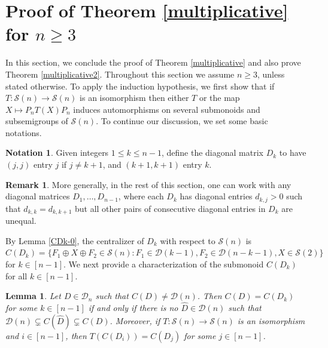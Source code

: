 \documentclass[11pt,reqno]{amsart}
\theoremstyle{plain}
\newtheorem{lemma}[theorem]{Lemma}
\theoremstyle{definition}
\newtheorem{defn}[theorem]{Definition}
\newtheorem{notation}[theorem]{Notation}
\newtheorem{rem}[theorem]{Remark}
\numberwithin{equation}{section}
\DeclareMathOperator{\diag}{diag}
\def\cS{\mathcal S}
\def\cD{\mathcal D}
\begin{document}
\section{Proof of Theorem \ref{multiplicative} for $n\geq3$}
In this section, we conclude the proof of Theorem \ref{multiplicative}  and also prove Theorem \ref{multiplicative2}.  Throughout this section we assume $n\geq 3$, unless stated otherwise. To apply the induction hypothesis, we  first show that if $T:\cS(n)\to \cS(n)$ is an isomorphism then either $T$ or the map $X \mapsto P_nT(X)P_n$ induces automorphisms on several submonoids and subsemigroups of $\cS(n)$. To continue our discussion, we set some basic notations.

\begin{notation}
	Given integers $1\leq k \leq n-1$, define the diagonal matrix $D_k$ to have $(j,j)$ entry $j$ if $j \neq k+1$, and $(k+1,k+1)$ entry $k$.
\end{notation}
\begin{rem}
More generally, in the rest of this section, one can work with any diagonal matrices $D_1, \dots, D_{n-1}$, where each $D_k$ has diagonal entries $d_{k,j} > 0$ such that $d_{k,k} = d_{k,k+1}$ but all other pairs of consecutive diagonal entries in $D_k$ are unequal.
\end{rem}


By Lemma \ref{CDk-0}, the centralizer of $D_k$ with respect to $\cS(n)$ is $C(D_k) = \{ F_1 \oplus X \oplus F_2 \in \cS(n): 
F_1\in \cD(k-1), F_2\in \cD(n-k-1), X \in \cS(2)\}$ for $k\in [n-1]$. We next provide a characterization of the  submonoid  $C(D_k)$ for all $k\in[n-1]$.
	
\begin{lemma}\label{CDk-01} Let $D \in \cD_n$ such that $C(D)\neq \cD(n)$. Then $C(D) = C(D_k)$ for some $k \in[n-1]$ if and only if  there is no $\hat D \in \cD(n)$ such that 
	$\cD(n) \subsetneq C(\hat D) \subsetneq C(D)$. Moreover, if $T:\cS(n)\to \cS(n)$ is an isomorphism and $i \in [n-1]$, then $T(C(D_i)) = C(D_j)$ for some $j\in [n-1]$.
\end{lemma}
\end{document}
